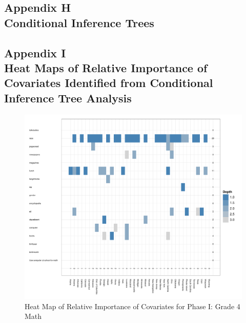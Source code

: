 \documentclass[letterpaper,12pt]{article}
\begin{document}
\cleardoublepage
{}
\subsection*{Appendix H\\Conditional Inference Trees}
\label{appendixtree}
\begin{singlespace}
 \clearpage
 \clearpage
\end{singlespace}


\cleardoublepage
{}
\subsection*{Appendix I\\Heat Maps of Relative Importance of Covariates Identified from Conditional Inference Tree Analysis}
\label{appendixtree}

\begin{figure}[h]
\begin{center}
\includegraphics[width=\textwidth]{../Figures/g4mathtreeHeat.pdf}
\caption{Heat Map of Relative Importance of Covariates for Phase I: Grade 4 Math}
\label{fig:g4math:treeheat}
\end{center}
\end{figure}
\end{document}
